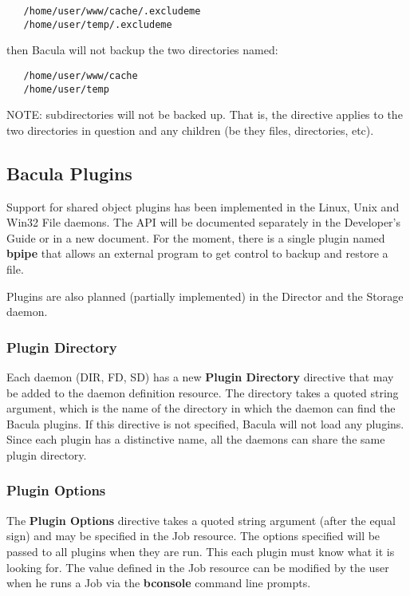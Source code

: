\begin{verbatim}
   /home/user/www/cache/.excludeme
   /home/user/temp/.excludeme
\end{verbatim}

then Bacula will not backup the two directories named:

\begin{verbatim}
   /home/user/www/cache
   /home/user/temp
\end{verbatim}

NOTE: subdirectories will not be backed up.  That is, the directive
applies to the two directories in question and any children (be they
files, directories, etc).


\subsection{Bacula Plugins}
Support for shared object plugins has been implemented in the Linux, Unix
and Win32 File daemons. The API will be documented separately in
the Developer's Guide or in a new document.  For the moment, there is
a single plugin named {\bf bpipe} that allows an external program to
get control to backup and restore a file.

Plugins are also planned (partially implemented) in the Director and the
Storage daemon.  

\subsubsection{Plugin Directory}
Each daemon (DIR, FD, SD) has a new {\bf Plugin Directory} directive that may
be added to the daemon definition resource. The directory takes a quoted 
string argument, which is the name of the directory in which the daemon can
find the Bacula plugins. If this directive is not specified, Bacula will not
load any plugins. Since each plugin has a distinctive name, all the daemons
can share the same plugin directory. 

\subsubsection{Plugin Options}
The {\bf Plugin Options} directive takes a quoted string
argument (after the equal sign) and may be specified in the
Job resource.  The options specified will be passed to all plugins
when they are run.  This each plugin must know what it is looking
for. The value defined in the Job resource can be modified
by the user when he runs a Job via the {\bf bconsole} command line 
prompts.

